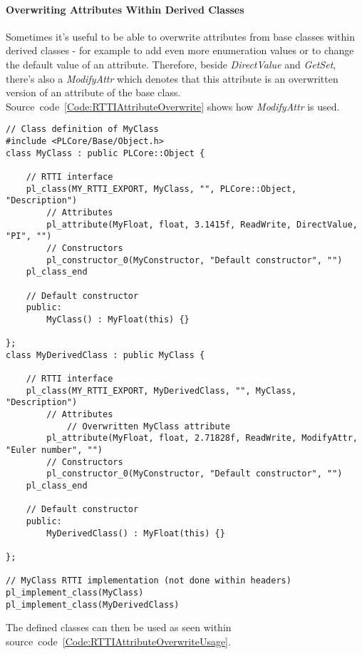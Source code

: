 \paragraph{Overwriting Attributes Within Derived Classes}
Sometimes it's useful to be able to overwrite attributes from base classes within derived classes - for example to add even more enumeration values or to change the default value of an attribute. Therefore, beside \emph{DirectValue} and \emph{GetSet}, there's also a \emph{ModifyAttr} which denotes that this attribute is an overwritten version of an attribute of the base class. Source~code~\ref{Code:RTTIAttributeOverwrite} shows how \emph{ModifyAttr} is used.
\begin{lstlisting}[label=Code:RTTIAttributeOverwrite,caption={Overwriting RTTI attributes in derived classes}]
// Class definition of MyClass
#include <PLCore/Base/Object.h>
class MyClass : public PLCore::Object {

	// RTTI interface
	pl_class(MY_RTTI_EXPORT, MyClass, "", PLCore::Object, "Description")
		// Attributes
		pl_attribute(MyFloat, float, 3.1415f, ReadWrite, DirectValue, "PI", "")
		// Constructors
		pl_constructor_0(MyConstructor, "Default constructor", "")
	pl_class_end

	// Default constructor
	public:
		MyClass() : MyFloat(this) {}

};
class MyDerivedClass : public MyClass {

	// RTTI interface
	pl_class(MY_RTTI_EXPORT, MyDerivedClass, "", MyClass, "Description")
		// Attributes
			// Overwritten MyClass attribute
		pl_attribute(MyFloat, float, 2.71828f, ReadWrite, ModifyAttr, "Euler number", "")
		// Constructors
		pl_constructor_0(MyConstructor, "Default constructor", "")
	pl_class_end

	// Default constructor
	public:
		MyDerivedClass() : MyFloat(this) {}

};

// MyClass RTTI implementation (not done within headers)
pl_implement_class(MyClass)
pl_implement_class(MyDerivedClass)
\end{lstlisting}
The defined classes can then be used as seen within source~code~\ref{Code:RTTIAttributeOverwriteUsage}.
